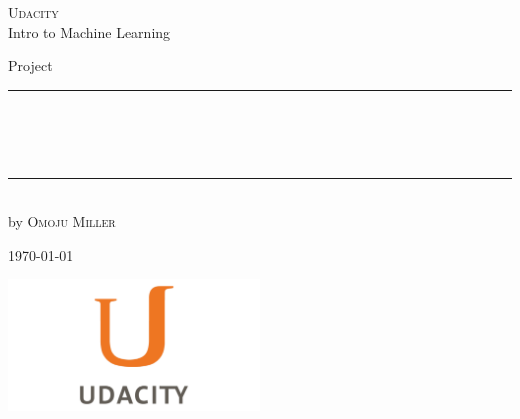 
\begin{titlepage}
    \begin{addmargin}[-1cm]{-3cm}
    \begin{center}
        \large
        {\Large \textsc{Udacity}}\\[1ex]
        Intro to Machine Learning\\
       

        \vfill

        Project\\ \vskip1cm
        \rule{14cm}{0.4pt}\\ \bigskip
        \begingroup
            \Large
            \color{Maroon}\spacedallcaps{\myTitle} \\ \bigskip
        \endgroup
        \spacedlowsmallcaps{\mySubtitle} \\ \bigskip
        \rule{14cm}{0.4pt}\\ \vskip1cm
        by \textsc{Omoju Miller}

        \vfill
        \vfill
        \vfill

       
        \hfill \today
    \end{center}
    \vspace{-3.5cm}
    \includegraphics[width=0.50\textwidth]{figures/udacity_logo}
  \end{addmargin}
\end{titlepage}
